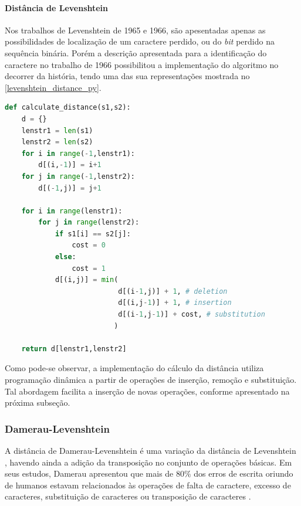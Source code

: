 \paragraph*{Distância de Levenshtein}
\label{sub:algoritmo_da_distancia}

Nos trabalhos de Levenshtein de 1965 e 1966, são apesentadas apenas as possibilidades de localização de um caractere perdido, ou do \textit{bit} perdido na sequência binária. Porém a descrição apresentada para a identificação do caractere no trabalho de 1966 \cite{levenshtein1966} possibilitou a implementação do algoritmo no decorrer da história, tendo uma das sua representações mostrada no \autoref{levenshtein_distance_py}.

\begin{lstlisting}[language=Python,label=levenshtein_distance_py,caption={Implementação da distância de Levenshtein}]
def calculate_distance(s1,s2):
    d = {}
    lenstr1 = len(s1)
    lenstr2 = len(s2)
    for i in range(-1,lenstr1):
        d[(i,-1)] = i+1
    for j in range(-1,lenstr2):
        d[(-1,j)] = j+1
 
    for i in range(lenstr1):
        for j in range(lenstr2):
            if s1[i] == s2[j]:
                cost = 0
            else:
                cost = 1
            d[(i,j)] = min(
                           d[(i-1,j)] + 1, # deletion
                           d[(i,j-1)] + 1, # insertion
                           d[(i-1,j-1)] + cost, # substitution
                          )

    return d[lenstr1,lenstr2]
\end{lstlisting}

Como pode-se observar, a implementação do cálculo da distância utiliza programação dinâmica a partir de operações de inserção, remoção e substituição. Tal abordagem facilita a inserção de novas operações, conforme apresentado na próxima subseção.

\subsubsection*{Damerau-Levenshtein} %
\label{sec:damerau_levenshtein}

A distância de Damerau-Levenshtein é uma variação da distância de Levenshtein \cite{levenshtein1965}, havendo ainda a adição da transposição no conjunto de operações básicas. Em seus estudos, Damerau apresentou que mais de $80\%$ dos erros de escrita oriundo de humanos estavam relacionados às operações de falta de caractere, excesso de caracteres, substituição de caracteres ou transposição de caracteres \cite{damerau1964technique}.


